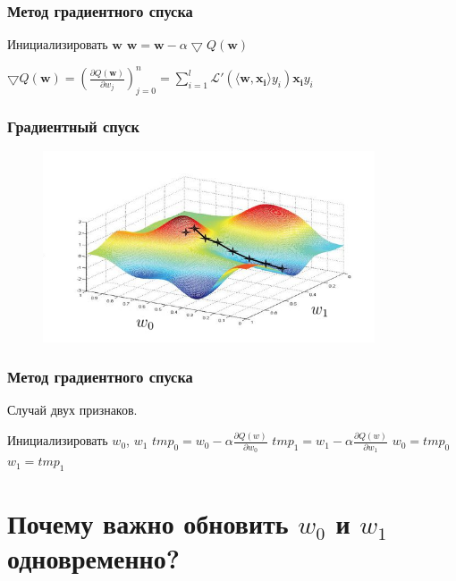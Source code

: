 \documentclass[10pt]{beamer}
\begin{document}
{
\begin{frame}\frametitle{Метод градиентного спуска}
  \begin{algorithmic}[1]
     \State Инициализировать $\mathbf{w}$
       \State $\mathbf{w} =  \mathbf{w} - \alpha \bigtriangledown Q(\mathbf{w})$
     \EndRepeat
    \EndFunction
  \end{algorithmic}
  \bigbreak
  \bigbreak
  \bigbreak
	$\bigtriangledown Q(\mathbf{w}) = \left(\frac{\partial Q(\mathbf{w})}{\partial w_j}\right)_{j=0}^n = \sum\limits_{i=1}^l \mathcal{L}'(\langle \mathbf{w}, \mathbf{x_i} \rangle y_i) \mathbf{x_i} y_i$
\end{frame}
}

\begin{frame}\frametitle{Градиентный спуск}
	\begin{figure}[htbp]
	  \includegraphics[height=160pt, keepaspectratio = true]{images/gradient_descent}
	\end{figure}
\end{frame}

\begin{frame}\frametitle{Метод градиентного спуска}
	Случай двух признаков.\\
	\begin{algorithmic}[1]
     \State Инициализировать $w_0$, $w_1$
       \State $tmp_0 =  w_0 - \alpha \frac{\partial Q(w)}{\partial w_0}$
       \State $tmp_1 =  w_1 - \alpha \frac{\partial Q(w)}{\partial w_1}$
       \State $w_0 = tmp_0$
       \State $w_1 = tmp_1$
     \EndRepeat
    \EndFunction
  \end{algorithmic}
\end{frame}

\section{Почему важно обновить $w_0$ и $w_1$ одновременно?}
\end{document}
